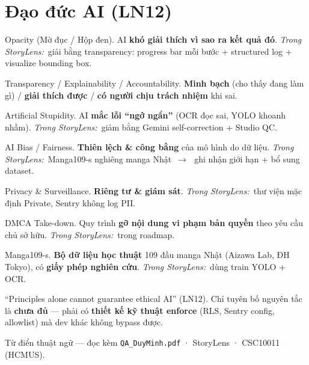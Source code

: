 \documentclass[11pt]{article}
\newcommand{\arr}{\,\ensuremath{\rightarrow}\,}
\newcommand{\insl}{\textit{\textcolor{steel}{Trong StoryLens:}}\ }
\begin{document}
\section{Đạo đức AI (LN12)}
\begin{terms}
\item[Opacity (Mờ đục / Hộp đen).] AI \textbf{khó giải thích vì sao ra kết quả đó}. \insl giải bằng transparency: progress bar mỗi bước + structured log + visualize bounding box.
\item[Transparency / Explainability / Accountability.] \textbf{Minh bạch} (cho thấy đang làm gì) / \textbf{giải thích được} / \textbf{có người chịu trách nhiệm} khi sai.
\item[Artificial Stupidity.] AI \textbf{mắc lỗi ``ngớ ngẩn''} (OCR đọc sai, YOLO khoanh nhầm). \insl giảm bằng Gemini self-correction + Studio QC.
\item[AI Bias / Fairness.] \textbf{Thiên lệch \& công bằng} của mô hình do dữ liệu. \insl Manga109-s nghiêng manga Nhật \arr\ ghi nhận giới hạn + bổ sung dataset.
\item[Privacy \& Surveillance.] \textbf{Riêng tư \& giám sát}. \insl thư viện mặc định Private, Sentry không log PII.
\item[DMCA Take-down.] Quy trình \textbf{gỡ nội dung vi phạm bản quyền} theo yêu cầu chủ sở hữu. \insl trong roadmap.
\item[Manga109-s.] \textbf{Bộ dữ liệu học thuật} 109 đầu manga Nhật (Aizawa Lab, ĐH Tokyo), có \textbf{giấy phép nghiên cứu}. \insl dùng train YOLO + OCR.
\item[``Principles alone cannot guarantee ethical AI'' (LN12).] Chỉ tuyên bố nguyên tắc là \textbf{chưa đủ} --- phải có \textbf{thiết kế kỹ thuật enforce} (RLS, Sentry config, allowlist) mà dev khác không bypass được.
\end{terms}

\vspace{8pt}
\begin{center}\small\color{soft}
Từ điển thuật ngữ --- đọc kèm \texttt{QA\_DuyMinh.pdf} · StoryLens · CSC10011 (HCMUS).
\end{center}
\end{document}
